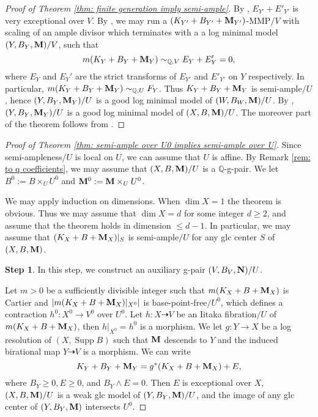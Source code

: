\documentclass[11pt]{amsart}
\numberwithin{equation}{section}
\newcommand{\Mm}{{\bf{M}}}
\newcommand{\NN}{{\bf{N}}}
\newcommand{\Qq}{\mathbb{Q}}
\newcommand{\Supp}{\operatorname{Supp}}
\theoremstyle{definition}
\theoremstyle{definition}
\theoremstyle{definition}
\begin{document}
\begin{proof}[Proof of Theorem \ref{thm: finite generation imply semi-ample}]
  By \cite[Lemma 3.2]{Bir12}, $E_{Y'}+E'_{Y'}$ is very exceptional
  over $V$. By \cite[Proposition 3.8]{HL22}, we may run a
  $(K_{Y'}+B_{Y'}+\Mm_{Y'})$-MMP$/V$ with scaling of an ample divisor
  which terminates with a a log minimal model $(Y,B_Y,\Mm)/V$, such that
  $$
  m(K_Y+B_Y+\Mm_Y)\sim_{\Qq,V}E_Y+E'_Y=0,
  $$
  where $E_Y$ and $E_Y'$ are the strict transforms of $E_{Y'}$ and
  $E'_{Y'}$ on $Y$ respectively.
  In particular, $m(K_Y+B_Y+\Mm_Y)\sim_{\Qq,U}F_Y$. Thus
  $K_Y+B_Y+\Mm_Y$ is semi-ample$/U$, hence $(Y,B_Y,\Mm_Y)/U$ is a
  good log minimal model of $(W,B_W,\Mm)/U$. By \cite[Lemma
  3.10]{HL21a}, $(Y,B_Y,\Mm_Y)/U$ is a good log minimal model of
  $(X,B,\Mm)/U$. The moreover part of the theorem follows from
  \cite[Theorem 2.24, Lemma 3.9]{HL21a}.
\end{proof}

\begin{proof}[Proof of Theorem \ref{thm: semi-ample over U0 implies
  semi-ample over U}] Since semi-ampleness$/U$ is local on $U$, we
  can assume that $U$ is affine. By Remark \ref{rem: to q
  coefficients}, we may assume that $(X,B,\Mm)/U$ is a $\Qq$-g-pair.
  We let $B^0:=B\times_UU^0$ and $\Mm^0:=\Mm\times_UU^0$.

  We may apply induction on dimensions. When $\dim X=1$ the theorem
  is obvious. Thus we may assume that $\dim X=d$ for some integer
  $d\geq 2$, and assume that the theorem holds in dimension $\leq
  d-1$. In particular, we may assume that $(K_X+B+\Mm_X)|_S$ is
  semi-ample$/U$ for any glc center $S$ of $(X,B,\Mm)$.

  \medskip

  \noindent\textbf{Step 1}. In this step, we construct an auxiliary
  g-pair $(V,B_V,\NN)/U$.

  \smallskip

  Let $m>0$ be a sufficiently divisible integer such that
  $m(K_X+B+\Mm_X)$ is Cartier and $|m(K_X+B+\Mm_X)|_{X^0}|$ is
  base-point-free$/U^0$, which defines a contraction $h^0: X^0\to
  V^0$ over $U^0$. Let $h: X\dashrightarrow V$ be an Iitaka
  fibration$/U$ of $m(K_X+B+\Mm_X)$, then $h|_{X^0}=h^0$ is a
  morphism. We let $g: Y\to X$ be a log resolution of $(X,\Supp B)$
  such that $\Mm$ descends to $Y$ and the induced birational map
  $Y\dashrightarrow V$ is a morphism. We can write
  $$K_Y+B_Y+\Mm_Y=g^*(K_X+B+\Mm_X)+E,$$
  where $B_Y\geq 0, E\geq 0$, and $B_Y\wedge E=0$. Then $E$ is
  exceptional over $X$, $(X,B,\Mm)/U$ is a weak glc model of
  $(Y,B_Y,\Mm)/U$, and the image of any glc center of $(Y,B_Y,\Mm)$
  intersects $U^0$.


\end{proof}
\end{document}
